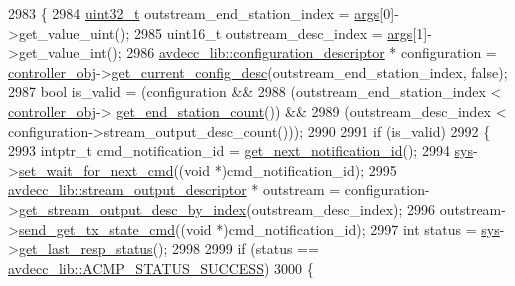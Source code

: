 \begin{DoxyCode}
2983 \{
2984     \hyperlink{parse_8c_a6eb1e68cc391dd753bc8ce896dbb8315}{uint32\_t} outstream\_end\_station\_index = \hyperlink{namespaceastime__fitline_a8187411843a6284ffb964ef3fb9fcab3}{args}[0]->get\_value\_uint();
2985     uint16\_t outstream\_desc\_index = \hyperlink{namespaceastime__fitline_a8187411843a6284ffb964ef3fb9fcab3}{args}[1]->get\_value\_int();
2986     \hyperlink{classavdecc__lib_1_1configuration__descriptor}{avdecc\_lib::configuration\_descriptor} * configuration = 
      \hyperlink{classcmd__line_af0a7784509e5bf1210a2aa19cea5df70}{controller\_obj}->\hyperlink{classavdecc__lib_1_1controller_af249ed146464b54d7fc9d87f67bcff46}{get\_current\_config\_desc}(outstream\_end\_station\_index, \textcolor{keyword}{
      false});
2987     \textcolor{keywordtype}{bool} is\_valid = (configuration &&
2988                      (outstream\_end\_station\_index < \hyperlink{classcmd__line_af0a7784509e5bf1210a2aa19cea5df70}{controller\_obj}->
      \hyperlink{classavdecc__lib_1_1controller_ab5ddf7b4a9718fe3e821289141f44485}{get\_end\_station\_count}()) &&
2989                      (outstream\_desc\_index < configuration->stream\_output\_desc\_count()));
2990 
2991     \textcolor{keywordflow}{if} (is\_valid)
2992     \{
2993         intptr\_t cmd\_notification\_id = \hyperlink{classcmd__line_a57486218387d1aa9d262eb7c176154ad}{get\_next\_notification\_id}();
2994         \hyperlink{classcmd__line_a485db4800e331cb4052c447fdf5d154e}{sys}->\hyperlink{classavdecc__lib_1_1system_a26b769584f10225077da47583edda33e}{set\_wait\_for\_next\_cmd}((\textcolor{keywordtype}{void} *)cmd\_notification\_id);
2995         \hyperlink{classavdecc__lib_1_1stream__output__descriptor}{avdecc\_lib::stream\_output\_descriptor} * outstream = 
      configuration->\hyperlink{classavdecc__lib_1_1configuration__descriptor_a300ea5957342e2e9579318135da02856}{get\_stream\_output\_desc\_by\_index}(outstream\_desc\_index);
2996         outstream->\hyperlink{classavdecc__lib_1_1stream__output__descriptor_a375f5a65c3267d9eaa2b92496d0c2c92}{send\_get\_tx\_state\_cmd}((\textcolor{keywordtype}{void} *)cmd\_notification\_id);
2997         \textcolor{keywordtype}{int} status = \hyperlink{classcmd__line_a485db4800e331cb4052c447fdf5d154e}{sys}->\hyperlink{classavdecc__lib_1_1system_aa63e8d1a4e51f695cdcccc9340922407}{get\_last\_resp\_status}();
2998 
2999         \textcolor{keywordflow}{if} (status == \hyperlink{namespaceavdecc__lib_ae0a51eed2d4dfed01460049a240d6f34a6e7347496acf3a05a9b3dab05deb8765}{avdecc\_lib::ACMP\_STATUS\_SUCCESS})
3000         \{

\end{DoxyCode}
